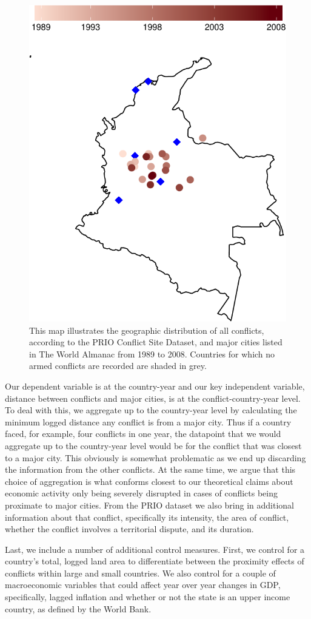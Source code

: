 \begin{figure}[ht]
	\centering
	\includegraphics[width=.5\textwidth]{colombiaMap-crop}
	\caption{This map illustrates the geographic distribution of all conflicts, according to the PRIO Conflict Site Dataset, and major cities listed in The World Almanac from 1989 to 2008. Countries for which no armed conflicts are recorded are shaded in grey.}
	\label{fig:columbiaMap}
\end{figure}

Our dependent variable is at the country-year and our key independent variable, distance between conflicts and major cities, is at the conflict-country-year level. To deal with this, we aggregate up to the country-year level by calculating the minimum logged distance any conflict is from a major city. Thus if a country faced, for example, four conflicts in one year, the datapoint that we would aggregate up to the country-year level would be for the conflict that was closest to a major city. This obviously is somewhat problematic as we end up discarding the information from the other conflicts. At the same time, we argue that this choice of aggregation is what conforms closest to our theoretical claims about economic activity only being severely disrupted in cases of conflicts being proximate to major cities. From the PRIO dataset we also bring in additional information about that conflict, specifically its intensity, the area of conflict, whether the conflict involves a territorial dispute, and its duration.

Last, we include a number of additional control measures. First, we control for a country's total, logged land area to differentiate between the proximity effects of conflicts within large and small countries. We also control for a couple of macroeconomic variables that could affect year over year changes in GDP, specifically, lagged inflation and whether or not the state is an upper income country, as defined by the World Bank.


